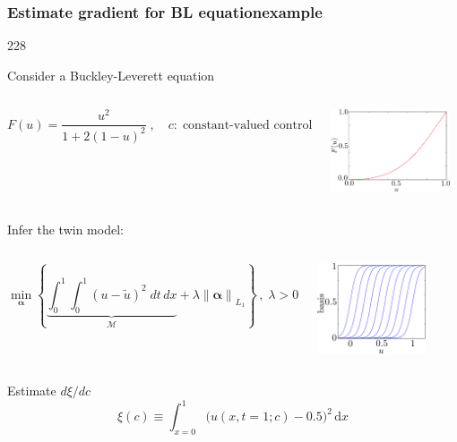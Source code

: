 \documentclass{beamer}
\let\oldcite=\cite
\renewcommand{\cite}[1]{\textcolor[rgb]{.4,.4,.85}{\oldcite{#1}}}
\newcommand{\barrow}{\item[\color{darkred}\ding{228}]}
\begin{document}
\begin{frame}
    \frametitle{Estimate gradient for BL equation\hfill \scriptsize{example}}\small
    \begin{dinglist}{228}
    \barrow 
    Consider a Buckley-Leverett equation \scriptsize \cite{Buckley 42}\small
    \begin{columns}
        $$
            F(u) = \frac{u^2}{1+2(1-u)^2} \;,\quad c: \;\textrm{constant-valued control}
        $$
        \begin{center}
            \includegraphics[width=3.5cm]{Buckley_flux.png}
        \end{center}
    \end{columns}
    \vspace{-.3cm}
    \barrow Infer the twin model:
    \begin{columns}
        $$
            \min_{\boldsymbol{\alpha}}\left\{ \underbrace{\int_0^1\int_0^1\left(u-\tilde{u}\right)^2\; dt\,dx}_{\mathcal{M}} + \lambda \left\|\boldsymbol{\alpha}\right\|_{L_1}\right\}\,,
            \; \lambda > 0
        $$
        \begin{center}
        \includegraphics[width=3.2cm]{fixed_basis_eg.png}
        \end{center}
    \end{columns}
    \vspace{-.3cm}
    \barrow
    Estimate $d\xi\slash dc\quad$ \scriptsize \cite{Kucuk 06}\small\\
    $$
        \xi(c) \equiv \int_{x=0}^1 \big(u(x,t=1;c) - 0.5\big)^2 \,\textrm{d}x
    $$
    \end{dinglist}
\end{frame}
\end{document}
